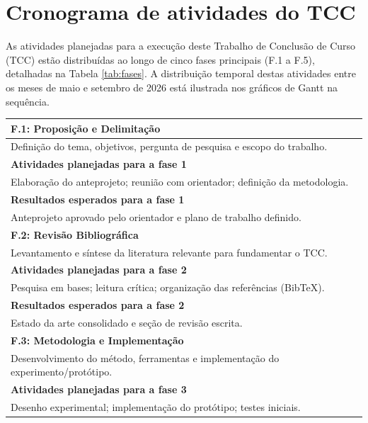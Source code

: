 \newpage
\section{Cronograma de atividades do TCC}
\label{sc:cronograma}

As atividades planejadas para a execução deste Trabalho de Conclusão de Curso (TCC) estão distribuídas ao longo de cinco fases principais (F.1 a F.5), detalhadas na Tabela \ref{tab:fases}. A distribuição temporal destas atividades entre os meses de maio e setembro de 2026 está ilustrada nos gráficos de Gantt na sequência.

\vspace{0.5cm}

\begin{longtable}{p{\textwidth}}
\toprule%
\myrowcolour%
\bfseries F.1: Proposição e Delimitação \\
\midrule
Definição do tema, objetivos, pergunta de pesquisa e escopo do trabalho. \\
\midrule
\myrowcolour%
\bfseries Atividades planejadas para a fase 1 \\
\midrule
Elaboração do anteprojeto; reunião com orientador; definição da metodologia. \\
\midrule
\myrowcolour%
\bfseries Resultados esperados para a fase 1\\
\midrule
Anteprojeto aprovado pelo orientador e plano de trabalho definido.\\
\toprule%
\myrowcolour%
\bfseries F.2: Revisão Bibliográfica \\
\midrule
Levantamento e síntese da literatura relevante para fundamentar o TCC. \\
\midrule
\myrowcolour%
\bfseries Atividades planejadas para a fase 2 \\
\midrule
Pesquisa em bases; leitura crítica; organização das referências (BibTeX). \\
\midrule
\myrowcolour%
\bfseries Resultados esperados para a fase 2 \\
\midrule
Estado da arte consolidado e seção de revisão escrita.\\
\toprule%
\myrowcolour%
\bfseries F.3: Metodologia e Implementação \\
\midrule
Desenvolvimento do método, ferramentas e implementação do experimento/protótipo. \\
\midrule
\myrowcolour%
\bfseries Atividades planejadas para a fase 3 \\
\midrule
Desenho experimental; implementação do protótipo; testes iniciais. \\

\end{longtable}
